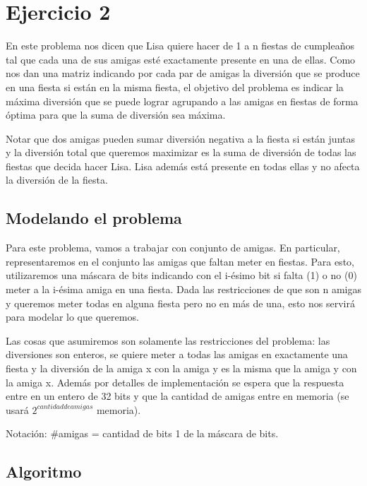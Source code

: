 \section{Ejercicio 2}


En este problema nos dicen que Lisa quiere hacer de 1 a n fiestas de cumpleaños tal que cada una de sus amigas esté exactamente presente en una de ellas. Como nos dan una matriz indicando por cada par de amigas la diversión que se produce en una fiesta si están en la misma fiesta, el objetivo del problema es indicar la máxima diversión que se puede lograr agrupando a las amigas en fiestas de forma óptima para que la suma de diversión sea máxima. \newline


Notar que dos amigas pueden sumar diversión negativa a la fiesta si están juntas y la diversión total que queremos maximizar es la suma de diversión de todas las fiestas que decida hacer Lisa. Lisa además está presente en todas ellas y no afecta la diversión de la fiesta.

\subsection{Modelando el problema}

Para este problema, vamos a trabajar con conjunto de amigas. En particular, representaremos en el conjunto las amigas que faltan meter en fiestas. Para esto, utilizaremos una máscara de bits indicando con el i-ésimo bit si falta (1) o no (0) meter a la i-ésima amiga en una fiesta. Dada las restricciones de que son n amigas y queremos meter todas en alguna fiesta pero no en más de una, esto nos servirá para modelar lo que queremos. \newline

Las cosas que asumiremos son solamente las restricciones del problema: las diversiones son enteros, se quiere meter a todas las amigas en exactamente una fiesta y la diversión de la amiga x con la amiga y es la misma que la amiga y con la amiga x. Además por detalles de implementación se espera que la respuesta entre en un entero de 32 bits y que la cantidad de amigas entre en memoria (se usará $2^{cantidad de amigas}$ memoria).

Notación: \#amigas = cantidad de bits 1 de la máscara de bits. \newline

\subsection{Algoritmo}


